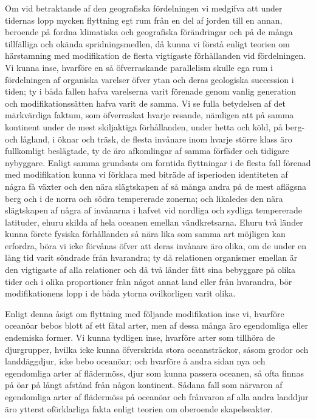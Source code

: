 Om vid betraktande af den geografiska fördelningen vi medgifva att under tidernas lopp mycken flyttning egt rum från en del af jorden till en annan, beroende på fordna klimatiska och geografiska förändringar och på de många tillfälliga och okända spridningsmedlen, då kunna vi förstå enligt teorien om härstamning med modifikation de flesta vigtigaste förhållanden vid fördelningen. Vi kunna inse, hvarföre en så öfverraskande parallelism skulle ega rum i fördelningen af organiska varelser öfver ytan och deras geologiska succession i tiden; ty i båda fallen hafva varelserna varit förenade genom vanlig generation och modifikationssätten hafva varit de samma. Vi se fulla betydelsen af det märkvärdiga faktum, som öfverraskat hvarje resande, nämligen att på samma kontinent under de mest skiljaktiga förhållanden, under hetta och köld, på berg- och lågland, i öknar och träsk, de flesta invånare inom hvarje större klass äro fullkomligt beslägtade, ty de äro afkomlingar af samma förfäder och tidigare nybyggare. Enligt samma grundsats om forntida flyttningar i de flesta fall förenad med modifikation kunna vi förklara med biträde af isperioden identiteten af några få växter och den nära slägtskapen af så många andra på de mest aflägsna berg och i de norra och södra tempererade zonerna; och likaledes den nära slägtskapen af några af invånarna i hafvet vid nordliga och sydliga tempererade latituder, ehuru skilda af hela oceanen emellan vändkretsarna. Ehuru två länder kunna förete fysiska förhållanden så nära lika som samma art möjligen kan erfordra, böra vi icke förvånas öfver att deras invånare äro olika, om de under en lång tid varit söndrade från hvarandra; ty då relationen organismer emellan är den vigtigaste af alla relationer och då två länder fått sina bebyggare på olika tider och i olika proportioner från något annat land eller från hvarandra, bör modifikationens lopp i de båda ytorna ovilkorligen varit olika.

Enligt denna åsigt om flyttning med följande modifikation inse vi, hvarföre oceanöar bebos blott af ett fåtal arter, men af dessa många äro egendomliga eller endemiska former. Vi kunna tydligen inse, hvarföre arter som tillhöra de djurgrupper, hvilka icke kunna öfverskrida stora oceansträckor, såsom grodor och landdäggdjur, icke bebo oceanöar; och hvarföre å andra sidan nya och egendomliga arter af flädermöss, djur som kunna passera oceanen, så ofta finnas på öar på långt afstånd från någon kontinent. Sådana fall som närvaron af egendomliga arter af flädermöss på oceanöar och frånvaron af alla andra landdjur äro ytterst oförklarliga fakta enligt teorien om oberoende skapelseakter.

